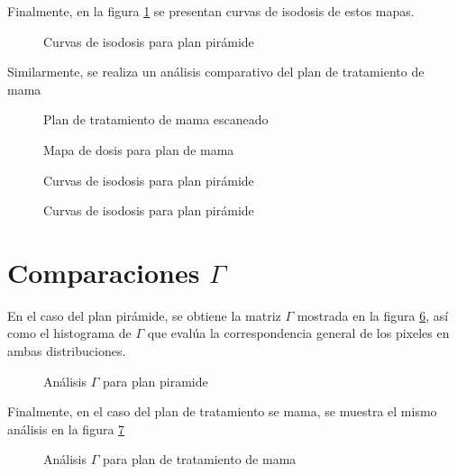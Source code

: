 Finalmente, en la figura \ref{fig:isodosisPiramide}  se presentan curvas de isodosis de estos mapas.\\ 
\begin{figure}
	\centering
	
	\caption{Curvas de isodosis para plan pirámide }
	\label{fig:isodosisPiramide}
\end{figure}

Similarmente, se realiza un análisis comparativo del plan de tratamiento de mama 
\begin{figure}
	\centering
	
	\caption{Plan de tratamiento de mama escaneado }
	\label{fig:mamaEscaneada}
\end{figure}
\begin{figure}
	\centering
	
	\caption{Mapa de dosis para plan de mama }
	\label{fig:mapaMama}
\end{figure}
\begin{figure}
	\centering
	
	\caption{Curvas de isodosis para plan pirámide }
	\label{fig:histogramaMama}
\end{figure}
\begin{figure}
	\centering
	
	\caption{Curvas de isodosis para plan pirámide }
	\label{fig:isodosisMama}
\end{figure}

\section{Comparaciones $\Gamma$}

En el caso del plan pirámide, se obtiene la matriz $\Gamma$ mostrada en la figura \ref{fig:gammaPiramide}, así como el histograma de $\Gamma$ que evalúa la correspondencia general de los pixeles en ambas distribuciones.\\
\begin{figure}
	\centering
	\caption{Análisis $\Gamma$ para plan piramide }
	\label{fig:gammaPiramide}
\end{figure}

Finalmente, en el caso del plan de tratamiento se mama, se muestra el mismo análisis en la figura \ref{fig:gammaMama}
\begin{figure}
	\centering
	\caption{Análisis $\Gamma$ para plan de tratamiento de mama}
	\label{fig:gammaMama}
\end{figure}




